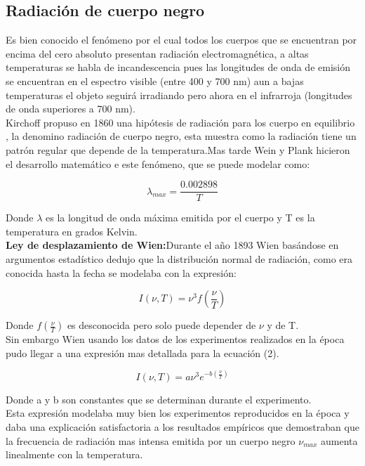 \subsection {Radiación de cuerpo negro}
Es bien conocido el fenómeno por el cual todos los cuerpos que se encuentran por encima del cero absoluto presentan radiación electromagnética, a altas temperaturas se habla de incandescencia pues las longitudes de onda de emisión se encuentran en el espectro visible (entre 400 y 700 nm) aun a bajas temperaturas  el objeto seguirá irradiando pero ahora en el infrarroja (longitudes de onda superiores a 700 nm).\cite{libro2} \\
Kirchoff propuso en 1860   una hipótesis  de radiación para los cuerpo en equilibrio , la denomino radiación de cuerpo negro, esta muestra como la radiación tiene un patrón regular que depende de la temperatura.Mas tarde  Wein y Plank  hicieron el desarrollo matemático e este fenómeno, que se puede modelar como:


\begin{equation}
    \lambda_{max}=\frac{0.002898}{T}
\end{equation}


Donde $ \lambda$ es la longitud de onda máxima emitida por el cuerpo y T es la temperatura en grados Kelvin.\\

\textbf{Ley de desplazamiento de Wien:}Durante el año 1893 Wien basándose en argumentos estadístico dedujo que la distribución normal de radiación, como era conocida hasta la fecha se modelaba  con la expresión:  


\begin{equation}
    I(\nu,T)=\nu^3 f \left(\frac{\nu}{T}\right)
\end{equation}


Donde $f\left(\frac{\nu}{T}\right)$ es desconocida pero solo puede depender de $\nu$ y de T.\\
Sin embargo Wien usando los datos de los experimentos realizados en la época pudo llegar a una expresión mas detallada para la ecuación  (2).  


\begin{equation}
    I(\nu,T)= a \nu^{3} e^{-b(\frac{\nu}{T})}
\end{equation}{}


Donde a y b son constantes que se determinan durante el experimento.\\
Esta expresión modelaba muy bien los experimentos  reproducidos en la época y daba una explicación satisfactoria a los resultados empíricos que demostraban que la frecuencia de radiación mas intensa emitida por un cuerpo negro $\nu_{max}$ aumenta linealmente con la temperatura.

